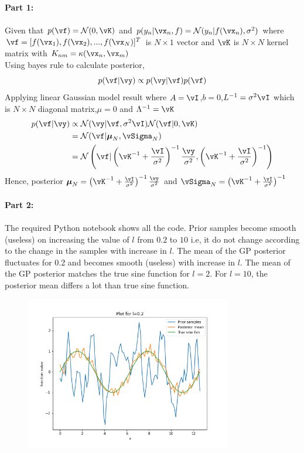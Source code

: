 \documentclass[a4paper,11pt]{article}
\begin{document}
\begin{pmisolution}
\textbf{Part 1:}\\\\
Given that \(p(\vf) = \mathcal{N}(0,\vK)\) and \(p(y_n|\vx_n,f) = \mathcal{N}(y_n|f(\vx_n),\sigma^2)\) where \(\vf = [f(\vx_1), f(\vx_2),...,f(\vx_N)]^T\) is \(N\times 1\) vector and \(\vK\) is \(N\times N\) kernel matrix with \(K_{nm} = \kappa(\vx_n,\vx_m)\)\\
Using bayes rule to calculate posterior,
\[p(\vf|\vy) \propto p(\vy|\vf)p(\vf) \]
Applying linear Gaussian model result where \(A=\vI\),\(b=0\),\(L^{-1}=\sigma^2\vI\) which is \(N\times N\) diagonal matrix,\(\mu = 0\) and \(\Lambda^{-1}= \vK\)
\begin{align*}
    p(\vf|\vy) &\propto \mathcal{N}(\vy|\vf,\sigma^2\vI)\mathcal{N}(\vf|0,\vK) \\
    &= \mathcal{N}(\vf|\boldsymbol{\mu}_N,\vSigma_{N})\\
    &= \mathcal{N}\left(\vf|\left(\vK^{-1} + \frac{\vI}{\sigma^2}\right)^{-1}\frac{\vy}{\sigma^2},\left(\vK^{-1} + \frac{\vI}{\sigma^2}\right)^{-1}\right)\\
\end{align*}
Hence, posterior \(\boldsymbol\mu_N = \left(\vK^{-1} + \frac{\vI}{\sigma^2}\right)^{-1}\frac{\vy}{\sigma^2}\) and \( \vSigma_{N} = \left(\vK^{-1} + \frac{\vI}{\sigma^2}\right)^{-1}\)\\\\
\textbf{Part 2:}\\\\
The required Python notebook shows all the code. Prior samples become smooth (useless) on increasing the value of \(l\) from \(0.2\) to \(10\) i.e, it do not change according to the change in the samples with increase in \(l\). The mean of the GP posterior fluctuates for 0.2 and becomes smooth (useless) with increase in \(l\). The mean of the GP posterior matches the true sine function for \(l=2\). For \(l=10\), the posterior mean differs a lot than true sine function.
\begin{figure}[h]
\centering
\includegraphics[height=2.65in]{question_4_0.2.png}

\end{figure}
\end{pmisolution}
\end{document}
